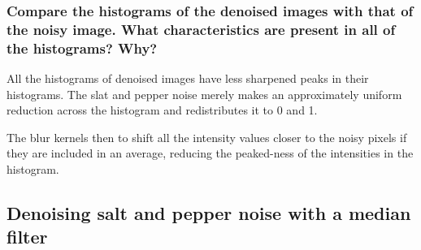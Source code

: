 \subsubsection{Compare the histograms of the denoised images with that of the noisy image. What characteristics are present in all of the histograms? Why?}
All the histograms of denoised images have less sharpened peaks in their histograms. The slat and pepper noise merely makes an approximately uniform reduction across the histogram and redistributes it to 0 and 1.

The blur kernels then to shift all the intensity values closer to the noisy pixels if they are included in an average, reducing the peaked-ness of the intensities in the histogram.

\begin{figure}[ht]
\centering
\end{figure}

\begin{figure}[ht]
\centering	
\end{figure}

\begin{figure}[ht]
\centering
\end{figure}


\clearpage
\subsection{Denoising salt and pepper noise with a median filter}

\begin{figure}[ht]
\centering
\end{figure}


